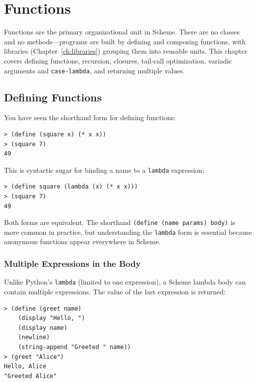 \chapter{Functions}
\label{ch:functions}

Functions are the primary organizational unit in Scheme. There are no classes and no methods---programs are built by defining and composing functions, with libraries (Chapter~\ref{ch:libraries}) grouping them into reusable units. This chapter covers defining functions, recursion, closures, tail-call optimization, variadic arguments and \texttt{case-lambda}, and returning multiple values.

\section{Defining Functions}

You have seen the shorthand form for defining functions:

\begin{lstlisting}[style=repl]
> (define (square x) (* x x))
> (square 7)
49
\end{lstlisting}

This is syntactic sugar for binding a name to a \texttt{lambda} expression:

\begin{lstlisting}[style=repl]
> (define square (lambda (x) (* x x)))
> (square 7)
49
\end{lstlisting}

Both forms are equivalent. The shorthand \texttt{(define (name params) body)} is more common in practice, but understanding the \texttt{lambda} form is essential because anonymous functions appear everywhere in Scheme.

\subsection{Multiple Expressions in the Body}

Unlike Python's \texttt{lambda} (limited to one expression), a Scheme lambda body can contain multiple expressions. The value of the last expression is returned:

\begin{lstlisting}[style=repl]
> (define (greet name)
    (display "Hello, ")
    (display name)
    (newline)
    (string-append "Greeted " name))
> (greet "Alice")
Hello, Alice
"Greeted Alice"
\end{lstlisting}

